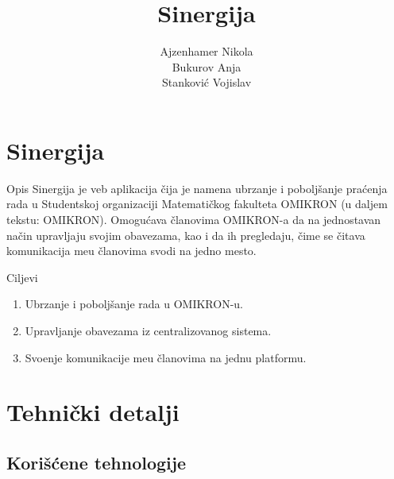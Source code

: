 \documentclass[xcolor={dvipsnames}, 11pt]{beamer}
\author{Ajzenhamer Nikola \\ Bukurov Anja \\ Stankovi\' c Vojislav }
\title{Sinergija}
\begin{document}

\begin{frame}
	\titlepage
\end{frame}

\section{Sinergija}

\begin{frame}{Opis}
Sinergija je veb aplikacija \v cija je namena ubrzanje i pobolj\v sanje pra\' cenja rada u Studentskoj organizaciji Matemati\v ckog fakulteta OMIKRON (u daljem tekstu: OMIKRON). Omogu\' cava \v clanovima OMIKRON-a da na jednostavan na\v cin upravljaju svojim obavezama, kao i da ih pregledaju, \v cime se \v citava komunikacija me\dj u \v clanovima svodi na jedno mesto.
\end{frame}
		
\begin{frame}{Ciljevi}
	\begin{enumerate}

		\item Ubrzanje i pobolj\v sanje rada u OMIKRON-u.
		\item Upravljanje obavezama iz centralizovanog sistema.
		\item Svo\dj enje komunikacije me\dj u \v clanovima na jednu platformu.
		

	\end{enumerate}
\end{frame}
	
\section{Tehni\v cki detalji}

\subsection{Kori\v s\' cene tehnologije}
\end{document}
